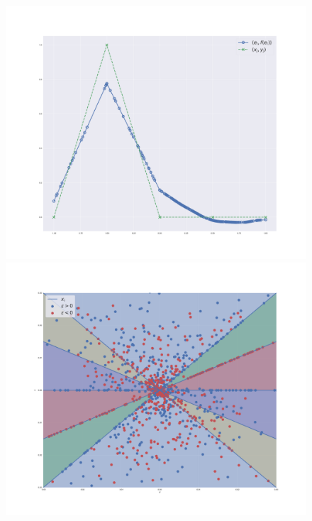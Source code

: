 \begin{figure}
    \centering
        \includegraphics[width=\linewidth]{figures/reduced_gradient_recon.pdf}
    \endminipage
        \includegraphics[width=\linewidth]{figures/reduced_gradient_phase.pdf}
    \endminipage

\end{figure}
